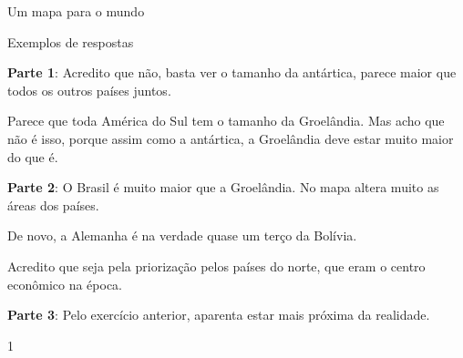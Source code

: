 \begin{resposta}{Um mapa para o mundo}
{ Exemplos de respostas
  \vspace{.3em}

  \textbf{Parte 1}:
  Acredito que não, basta ver o tamanho da antártica, parece maior que todos os outros países juntos. 

  Parece que toda América do Sul tem o tamanho da Groelândia. Mas acho que não é isso, porque assim como a antártica, a Groelândia deve estar muito maior do que é.
  \vspace{.3em}

  \textbf{Parte 2}:
  O Brasil é muito maior que a Groelândia. No mapa altera muito as áreas dos países.

  De novo, a Alemanha é na verdade quase um terço da Bolívia.

  Acredito que seja pela priorização pelos países do norte, que eram o centro econômico na época.

  \vspace{.3em}
  \textbf{Parte 3}:
  Pelo exercício anterior, aparenta estar mais próxima da realidade.
}{1}
\end{resposta}
\label{mapamundo1}

